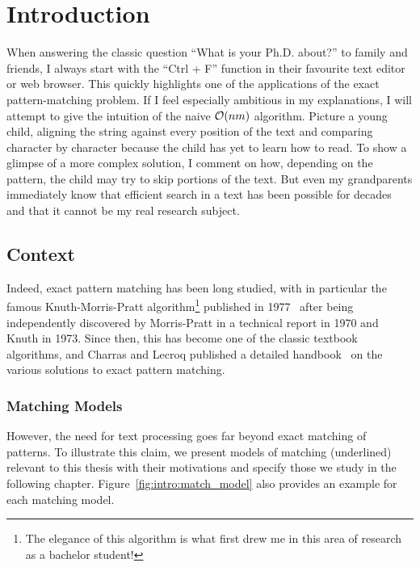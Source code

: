 \chapter*{Introduction}\label{chap:intro}\setcounter{page}{1}\frontmatter
{}

When answering the classic question ``What is your Ph.D. about?'' to family and friends, I always start with the ``Ctrl + F'' function in their favourite text editor or web browser. This quickly highlights one of the applications of the exact pattern-matching problem. If I feel especially ambitious in my explanations, I will attempt to give the intuition of the naive $\mathcal{O}(nm)$ algorithm. Picture a young child, aligning the string against every position of the text and comparing character by character because the child has yet to learn how to read. To show a glimpse of a more complex solution, I comment on how, depending on the pattern, the child may try to skip portions of the text. But even my grandparents immediately know that efficient search in a text has been possible for decades and that it cannot be my real research subject.

\section{Context}

Indeed, exact pattern matching has been long studied, with in particular the famous Knuth-Morris-Pratt algorithm\footnote{The elegance of this algorithm is what first drew me in this area of research as a bachelor student!} published in 1977~\cite{KMP} after being independently discovered by Morris-Pratt in a technical report in 1970 and Knuth in 1973. Since then, this has become one of the classic textbook algorithms, and Charras and Lecroq published a detailed handbook~\cite{charras2004handbook} on the various solutions to exact pattern matching.

\subsection{Matching Models}\label{sec:intro:complex}



However, the need for text processing goes far beyond exact matching of patterns. To illustrate this claim, we present models of matching (underlined) relevant to this thesis with their motivations and specify those we study in the following chapter. Figure~\ref{fig:intro:match_model} also provides an example for each matching model.

